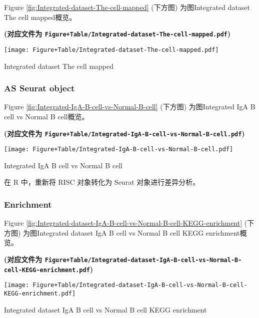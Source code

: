 \documentclass[
]{article}
\begin{document}
Figure \ref{fig:Integrated-dataset-The-cell-mapped} (下方图) 为图Integrated dataset The cell mapped概览。

\textbf{(对应文件为 \texttt{Figure+Table/Integrated-dataset-The-cell-mapped.pdf})}

\def\@captype{figure}
\begin{center}
\texttt{[image: Figure+Table/Integrated-dataset-The-cell-mapped.pdf]}
\caption{Integrated dataset The cell mapped}\label{fig:Integrated-dataset-The-cell-mapped}
\end{center}

\hypertarget{as-seurat-object}{%
\subsubsection{AS Seurat object}\label{as-seurat-object}}

Figure \ref{fig:Integrated-IgA-B-cell-vs-Normal-B-cell} (下方图) 为图Integrated IgA B cell vs Normal B cell概览。

\textbf{(对应文件为 \texttt{Figure+Table/Integrated-IgA-B-cell-vs-Normal-B-cell.pdf})}

\def\@captype{figure}
\begin{center}
\texttt{[image: Figure+Table/Integrated-IgA-B-cell-vs-Normal-B-cell.pdf]}
\caption{Integrated IgA B cell vs Normal B cell}\label{fig:Integrated-IgA-B-cell-vs-Normal-B-cell}
\end{center}

在 R 中，重新将 RISC 对象转化为 Seurat 对象进行差异分析。

\hypertarget{enrichment}{%
\subsubsection{Enrichment}\label{enrichment}}

Figure \ref{fig:Integrated-dataset-IgA-B-cell-vs-Normal-B-cell-KEGG-enrichment} (下方图) 为图Integrated dataset IgA B cell vs Normal B cell KEGG enrichment概览。

\textbf{(对应文件为 \texttt{Figure+Table/Integrated-dataset-IgA-B-cell-vs-Normal-B-cell-KEGG-enrichment.pdf})}

\def\@captype{figure}
\begin{center}
\texttt{[image: Figure+Table/Integrated-dataset-IgA-B-cell-vs-Normal-B-cell-KEGG-enrichment.pdf]}
\caption{Integrated dataset IgA B cell vs Normal B cell KEGG enrichment}\label{fig:Integrated-dataset-IgA-B-cell-vs-Normal-B-cell-KEGG-enrichment}
\end{center}
\end{document}

